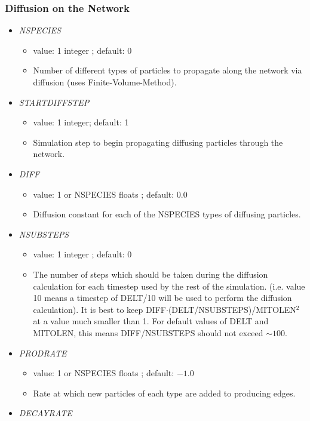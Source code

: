 \documentclass[12pt]{article}
\begin{document}
\subsubsection*{Diffusion on the Network}
\begin{itemize}
%
\item {\it NSPECIES}
  \begin{itemize}
    \item  value: 1 integer ; default: $0$
    \item Number of different types of particles to propagate along the network via diffusion (uses Finite-Volume-Method).
  \end{itemize}
%
\item {\it STARTDIFFSTEP}
  \begin{itemize}
    \item  value: 1 integer; default: 1
    \item Simulation step to begin propagating diffusing particles through the network.
  \end{itemize}
%
\item {\it DIFF}
  \begin{itemize}
    \item  value: 1 or NSPECIES floats ; default: 0.0
    \item Diffusion constant for each of the NSPECIES types of diffusing particles.
  \end{itemize}
%
\item {\it NSUBSTEPS}
  \begin{itemize}
    \item  value: 1 integer ; default: 0
    \item The number of steps which should be taken during the diffusion calculation for each timestep used by the rest of the simulation. (i.e. value 10 means a timestep of DELT/10 will be used to perform the diffusion calculation). It is best to keep DIFF$\cdot$(DELT/NSUBSTEPS)/MITOLEN$^2$ at a value much smaller than 1. For default values of DELT and MITOLEN, this means DIFF/NSUBSTEPS should not exceed $\sim100$.
  \end{itemize}
%
\item {\it PRODRATE}
  \begin{itemize}
    \item  value: 1 or NSPECIES floats ; default: $-1.0$
    \item Rate at which new particles of each type are added to producing edges.
  \end{itemize}
%
\item {\it DECAYRATE}

\end{itemize}
\end{document}
